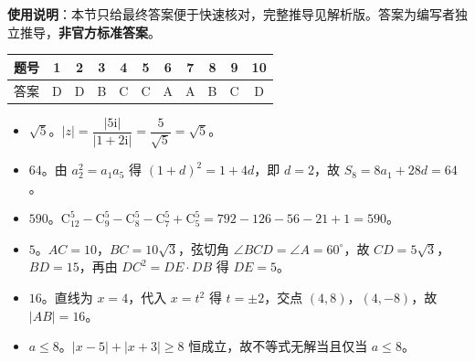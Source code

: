 
\begin{gknotice}
\textbf{使用说明}：本节只给最终答案便于快速核对，完整推导见解析版。答案为编写者独立推导，\textbf{非官方标准答案}。
\end{gknotice}

\begin{center}\begin{tabular}{ccccccccccc}
\toprule
题号 & 1 & 2 & 3 & 4 & 5 & 6 & 7 & 8 & 9 & 10 \\
\midrule
答案 & D & D & B & C & C & A & A & B & C & D \\
\bottomrule
\end{tabular}\end{center}

\begin{itemize}[leftmargin=2.6em]
  \item[\textbf{11.}] $\sqrt5$。$|z|=\dfrac{|5\mathrm i|}{|1+2\mathrm i|}=\dfrac5{\sqrt5}=\sqrt5$。
  \item[\textbf{12.}] $64$。由 $a_2^2=a_1a_5$ 得 $(1+d)^2=1+4d$，即 $d=2$，故 $S_8=8a_1+28d=64$。
  \item[\textbf{13.}] $590$。$\mathrm C_{12}^5-\mathrm C_9^5-\mathrm C_8^5-\mathrm C_7^5+\mathrm C_5^5=792-126-56-21+1=590$。
  \item[\textbf{14.}] $5$。$AC=10$，$BC=10\sqrt3$，弦切角 $\angle BCD=\angle A=60^\circ$，故 $CD=5\sqrt3$，$BD=15$，再由 $DC^2=DE\cdot DB$ 得 $DE=5$。
  \item[\textbf{15.}] $16$。直线为 $x=4$，代入 $x=t^2$ 得 $t=\pm2$，交点 $(4,8)$，$(4,-8)$，故 $|AB|=16$。
  \item[\textbf{16.}] $a\leqslant8$。$|x-5|+|x+3|\geqslant8$ 恒成立，故不等式无解当且仅当 $a\leqslant8$。
\end{itemize}

